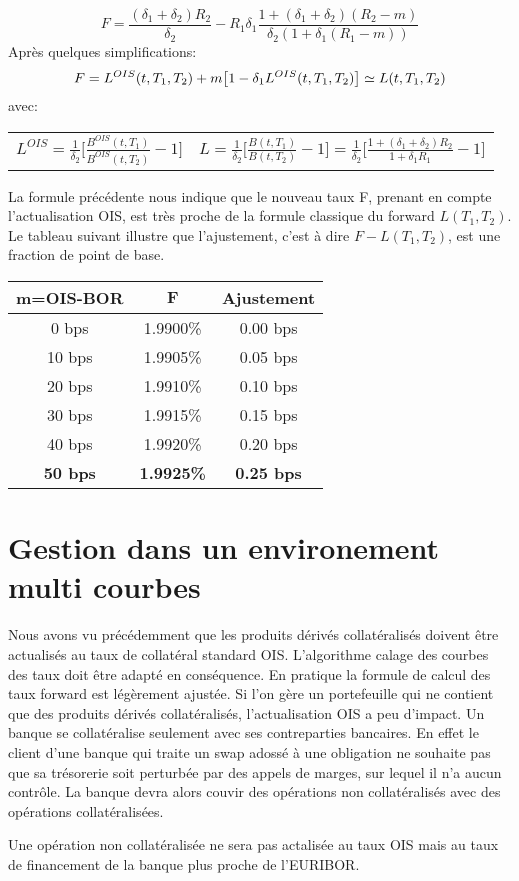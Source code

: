 \documentclass{article}
\begin{document}
\[
F=\frac{(\delta_1+\delta_2) R_2}{\delta_2}-R_1 \delta_1 \frac{1+(\delta_1+\delta_2) (R_2-m)}{\delta_2 (1+\delta_1 (R_1-m))}
\]
Après quelques simplifications:\\
\[
F=L^{OIS}(t,T_1,T_2)+m \big[ 1 - \delta_1 L^{OIS}(t,T_1,T_2) \big] \simeq L(t,T_1,T_2) \\
\]
avec:\\
\begin{center}
\begin{tabular}{c c}
$L^{OIS}=\frac{1}{\delta_2}\big[ \frac{B^{OIS}(t,T_1)}{B^{OIS}(t,T_2)}-1 \big]$&
$L=\frac{1}{\delta_2}\big[ \frac{B(t,T_1)}{B(t,T_2)}-1 \big]=\frac{1}{\delta_2}\big[\frac{1+(\delta_1+\delta_2) R_2}{1+\delta_1 R_1}-1\big]$\\
\end{tabular}
\end{center}
La formule précédente nous indique que le nouveau taux F, prenant en compte l'actualisation OIS, est très proche de la formule classique du forward $L(T_1,T_2)$. Le tableau suivant illustre que l'ajustement, c'est à dire $F-L(T_1,T_2)$, est une fraction de point de base.
\begin{center}
\begin{tabular}{|c|c|c|}  
\hline  
\textbf{m=OIS-BOR} & $\textbf{F}$ & \textbf{Ajustement} \\ 
\hline  
0 bps & 1.9900\%&0.00 bps\\ 
10 bps & 1.9905\%&0.05 bps\\ 
20 bps & 1.9910\%&0.10 bps\\ 
30 bps & 1.9915\%&0.15 bps\\ 
40 bps & 1.9920\%&0.20 bps\\ 
\textbf{\color{red}50 bps} & \textbf{\color{red}1.9925\%}&\textbf{\color{red}0.25 bps}\\ 
\hline 
\end{tabular}
\end{center}
\section*{Gestion dans un environement multi courbes}
Nous avons vu précédemment que les produits dérivés collatéralisés doivent être actualisés au taux de collatéral standard OIS. L'algorithme calage des courbes des taux doit être adapté en conséquence. En pratique la formule de calcul des taux forward est légèrement ajustée. Si l'on gère un portefeuille qui ne contient que des produits dérivés collatéralisés, l'actualisation OIS a peu d'impact. Un banque se collatéralise seulement avec ses contreparties bancaires. En effet le client d'une banque qui traite un swap adossé à une obligation ne souhaite pas que sa trésorerie soit perturbée par des appels de marges, sur lequel il n'a aucun contrôle. La banque devra alors couvir des opérations non collatéralisés avec des opérations collatéralisées.

Une opération non collatéralisée ne sera pas actalisée au taux OIS mais au taux de financement de la banque plus proche de l'EURIBOR.  
\end{document}
